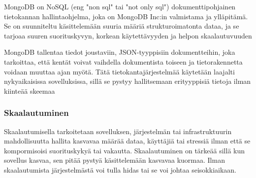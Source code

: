 
















MongoDB on NoSQL (eng "non sql"{} tai "not only sql"{}) dokumenttipohjainen tietokannan hallintaohjelma,
joka on MongoDB Inc:in valmistama ja ylläpitämä.
Se on suunniteltu käsittelemään suuria määriä strukturoimatonta dataa,
ja se tarjoaa suuren suorituskyvyn, korkean käytettävyyden ja helpon skaalautuvuuden
\medskip




MongoDB tallentaa tiedot joustaviin, JSON-tyyppisiin dokumentteihin, 
joka tarkoittaa, että kentät voivat vaihdella dokumentista toiseen ja tietorakennetta voidaan muuttaa ajan myötä. 
Tätä tietokantajärjestelmää käytetään laajalti nykyaikaisissa sovelluksissa, 
sillä se pystyy hallitsemaan erityyppisiä tietoja ilman kiinteää skeemaa
\medskip








\subsubsection{Skaalautuminen}




Skaalautumisella tarkoitetaan sovelluksen, järjestelmän tai infrastruktuurin
mahdollisuutta hallita kasvavaa määrää dataa, käyttäjiä tai stressiä ilman että se kompormisoisi suorituskykyä tai vakautta.
Skaalautuminen on tärkeää sillä kun sovellus kasvaa, sen pitää pystyä käsittelemään kasvavaa kuormaa.
Ilman skaalautumista järjestelmästä voi tulla hidas tai se voi johtaa seisokkiaikaan.
\medskip

